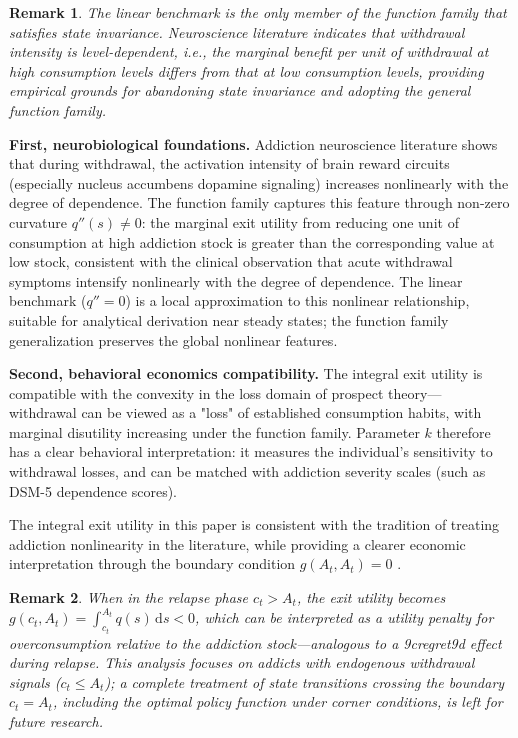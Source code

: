 \documentclass[12pt]{article}
\newtheorem{remark}{Remark}
\begin{document}
\begin{remark}
The linear benchmark is the only member of the function family that satisfies state invariance.
Neuroscience literature indicates that withdrawal intensity is level-dependent\cite{Koob2010},
i.e., the marginal benefit per unit of withdrawal at high consumption levels differs from that at low consumption levels,
providing empirical grounds for abandoning state invariance and adopting the general function family.
\end{remark}

\textbf{First, neurobiological foundations.}
Addiction neuroscience literature shows that during withdrawal, the activation intensity of brain reward circuits (especially nucleus accumbens dopamine signaling)
increases nonlinearly with the degree of dependence\cite{Koob2010}.
The function family captures this feature through non-zero curvature $q''(s) \neq 0$:
the marginal exit utility from reducing one unit of consumption at high addiction stock is greater than the corresponding value at low stock,
consistent with the clinical observation that acute withdrawal symptoms intensify nonlinearly with the degree of dependence.
The linear benchmark ($q''=0$) is a local approximation to this nonlinear relationship,
suitable for analytical derivation near steady states; the function family generalization preserves the global nonlinear features.
 
\textbf{Second, behavioral economics compatibility.}
The integral exit utility is compatible with the convexity in the loss domain of prospect theory\cite{Kahneman1979}---
withdrawal can be viewed as a "loss" of established consumption habits, with marginal disutility increasing under the function family.
Parameter $k$ therefore has a clear behavioral interpretation:
it measures the individual's sensitivity to withdrawal losses,
and can be matched with addiction severity scales (such as DSM-5 dependence scores).

The integral exit utility in this paper is consistent with the tradition of treating addiction nonlinearity in the literature,
while providing a clearer economic interpretation through the boundary condition $g(A_t, A_t) = 0$ \cite{Orphanides1995}.

\begin{remark}
When in the relapse phase $c_t > A_t$, the exit utility becomes
$g(c_t, A_t) = \int_{c_t}^{A_t} q(s)\,\mathrm{d}s < 0$,
which can be interpreted as a utility penalty for overconsumption relative to the addiction stock---analogous to a \x9cregret\x9d effect during relapse.
This analysis focuses on addicts with endogenous withdrawal signals ($c_t \leq A_t$);
a complete treatment of state transitions crossing the boundary $c_t = A_t$, including the optimal policy function under corner conditions, is left for future research.
\end{remark}
\end{document}
